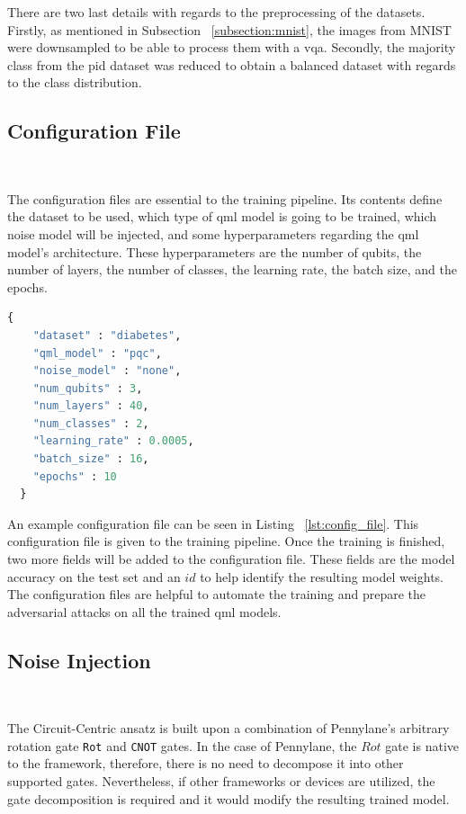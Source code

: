 There are two last details with regards to the preprocessing
of the datasets. Firstly, as mentioned in Subsection
~\ref{subsection:mnist}, the images from MNIST were downsampled
to be able to process them with a \ac{vqa}. Secondly, the majority
class from the \ac{pid} dataset was reduced to obtain a balanced
dataset with regards to the class distribution. \

\subsection{Configuration File}\label{subsection:config} \

The configuration files are essential to the training
pipeline. Its contents define the dataset to be used,
which type of \ac{qml} model is going to be trained,
which noise model will be injected, and some hyperparameters
regarding the \ac{qml} model's architecture. These hyperparameters
are the number of qubits, the number of layers, the number of
classes, the learning rate, the batch size, and the epochs. \

\begin{lstlisting}[language=Python, caption={Example configuration file.}, label=lst:config_file]
  {
    "dataset" : "diabetes",
    "qml_model" : "pqc",
    "noise_model" : "none",
    "num_qubits" : 3,
    "num_layers" : 40,
    "num_classes" : 2,
    "learning_rate" : 0.0005,
    "batch_size" : 16,
    "epochs" : 10
  }
\end{lstlisting}

An example configuration file can be seen in Listing
~\ref{lst:config_file}. This configuration file is given
to the training pipeline. Once the training is finished,
two more fields will be added to the configuration file.
These fields are the model accuracy on the test set and an
\(id\) to help identify the resulting model weights. The
configuration files are helpful to automate the training
and prepare the adversarial attacks on all the trained
\ac{qml} models. \

\subsection{Noise Injection}\label{subsection:noise_injection} \

The Circuit-Centric ansatz is built upon a combination of 
Pennylane's arbitrary rotation gate \colorbox{inline_gray}{\lstinline|Rot|}
and \colorbox{inline_gray}{\lstinline|CNOT|} gates. In the case
of Pennylane, the \(Rot\) gate is native to the framework, therefore,
there is no need to decompose it into other supported gates.
Nevertheless, if other frameworks or devices are utilized,
the gate decomposition is required and it would modify the resulting
trained model. \

